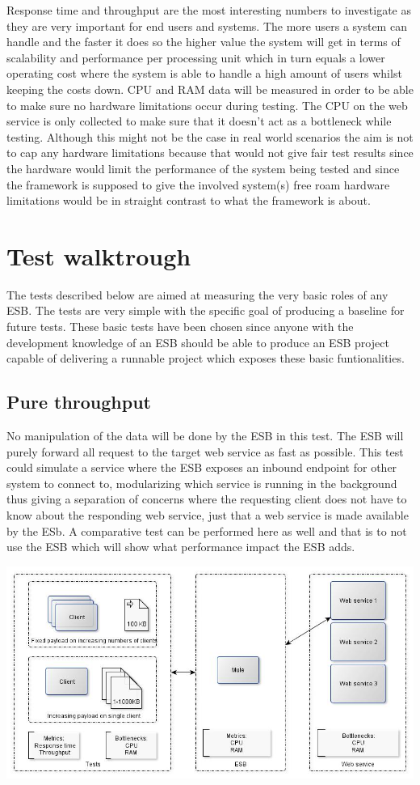 Response time and throughput are the most interesting numbers to investigate as they are very important for end users and systems. The more users a system can handle and the faster it does so the higher value the system will get in terms of scalability and performance per processing unit which in turn equals a lower operating cost where the system is able to handle a high amount of users whilst keeping the costs down.
CPU and RAM data will be measured in order to be able to make sure no hardware limitations occur during testing. The CPU on the web service is only collected to make sure that it doesn't act as a bottleneck while testing. Although this might not be the case in real world scenarios the aim is not to cap any hardware limitations because that would not give fair test results since the hardware would limit the performance of the system being tested and since the framework is supposed to give the involved system(s) free roam hardware limitations would be in straight contrast to what the framework is about.

\section{Test walktrough}
The tests described below are aimed at measuring the very basic roles of any ESB. 
The tests are very simple with the specific goal of producing a baseline for future tests. 
These basic tests have been chosen since anyone with the development knowledge of an ESB should be able to produce an ESB project capable of delivering a runnable project which exposes these basic funtionalities.

\subsection{Pure throughput}
No manipulation of the data will be done by the ESB in this test. The ESB will purely forward all request to the target web service as fast as possible. 
This test could simulate a service where the ESB exposes an inbound endpoint for other system to connect to, modularizing which service is running in the background thus giving a separation of concerns where the requesting client does not have to know about the responding web service, just that a web service is made available by the ESb.
A comparative test can be performed here as well and that is to not use the ESB which will show what performance impact the ESB adds. 

\centerline{\includegraphics[scale=0.43]{img/direct_proxy}}

